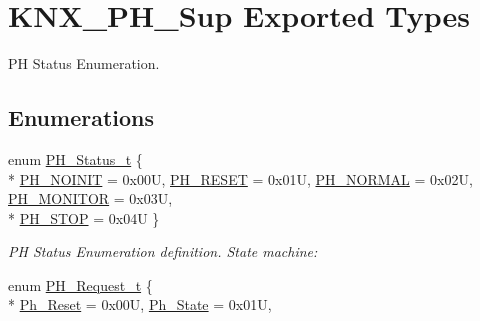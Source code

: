 \hypertarget{group___k_n_x___p_h___sup___exported___types}{}\section{K\+N\+X\+\_\+\+P\+H\+\_\+\+Sup Exported Types}
\label{group___k_n_x___p_h___sup___exported___types}


PH Status Enumeration.  


\subsection*{Enumerations}
\begin{DoxyCompactItemize}
\item 
enum \hyperlink{group___k_n_x___p_h___sup___exported___types_ga5b665a94bef912fbfbea7cc949ed0e49}{P\+H\+\_\+\+Status\+\_\+t} \{ \\*
\hyperlink{group___k_n_x___p_h___sup___exported___types_gga5b665a94bef912fbfbea7cc949ed0e49a329f30393c5729b777643b93478de68c}{P\+H\+\_\+\+N\+O\+I\+N\+IT} = 0x00U, 
\hyperlink{group___k_n_x___p_h___sup___exported___types_gga5b665a94bef912fbfbea7cc949ed0e49a69a4299f68e66ea3fbe9477582ac02cd}{P\+H\+\_\+\+R\+E\+S\+ET} = 0x01U, 
\hyperlink{group___k_n_x___p_h___sup___exported___types_gga5b665a94bef912fbfbea7cc949ed0e49a4be7dd56ae47b708c6f4751714efe930}{P\+H\+\_\+\+N\+O\+R\+M\+AL} = 0x02U, 
\hyperlink{group___k_n_x___p_h___sup___exported___types_gga5b665a94bef912fbfbea7cc949ed0e49a0cd2cf806d22fe2f69ac027782ddbf15}{P\+H\+\_\+\+M\+O\+N\+I\+T\+OR} = 0x03U, 
\\*
\hyperlink{group___k_n_x___p_h___sup___exported___types_gga5b665a94bef912fbfbea7cc949ed0e49ae9fe73aeee988939ec19ed18c57250dc}{P\+H\+\_\+\+S\+T\+OP} = 0x04U
 \}\begin{DoxyCompactList}\small\item\em PH Status Enumeration definition. State machine\+: \end{DoxyCompactList}
\item 
enum \hyperlink{group___k_n_x___p_h___sup___exported___types_ga78f5bed722457f025cbc6786d5730d3e}{P\+H\+\_\+\+Request\+\_\+t} \{ \\*
\hyperlink{group___k_n_x___p_h___sup___exported___types_gga78f5bed722457f025cbc6786d5730d3eaf0efc940702df223316668e6712b5ba4}{Ph\+\_\+\+Reset} = 0x00U, 
\hyperlink{group___k_n_x___p_h___sup___exported___types_gga78f5bed722457f025cbc6786d5730d3eae26a34f7945078eabc251ea8570136ef}{Ph\+\_\+\+State} = 0x01U, 

\end{DoxyCompactItemize}

